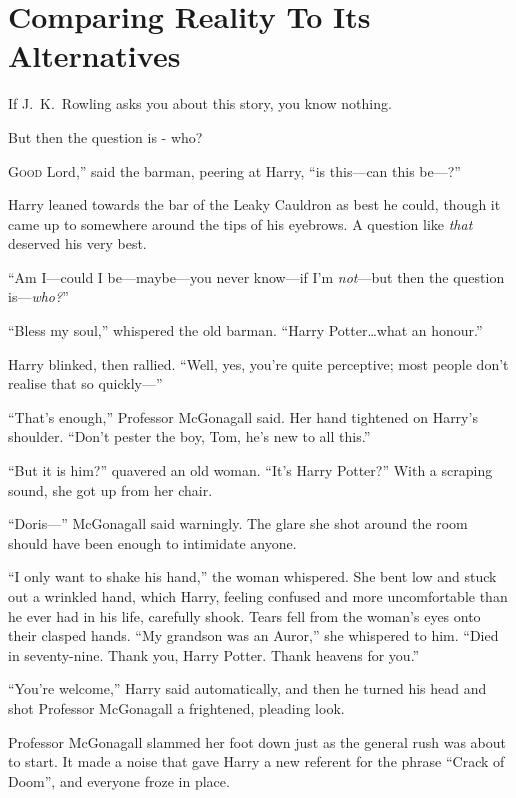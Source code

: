 \chapter{Comparing Reality To Its Alternatives}

\begin{chapterOpeningAuthorNote}
If J.~K.~Rowling asks you about this story, you know nothing.
\end{chapterOpeningAuthorNote}
\begin{chapterOpeningQuote}
But then the question is - who?
\end{chapterOpeningQuote}

\lettrine[ante=“]{G}{ood} Lord,” said the barman, peering at Harry, “is this—can this be—?”

Harry leaned towards the bar of the Leaky Cauldron as best he could, though it came up to somewhere around the tips of his eyebrows. A question like \emph{that} deserved his very best.

“Am I—could I be—maybe—you never know—if I’m \emph{not}—but then the question is—\emph{who?}”

“Bless my soul,” whispered the old barman. “Harry Potter…what an honour.”

Harry blinked, then rallied. “Well, yes, you’re quite perceptive; most people don’t realise that so quickly—”

“That’s enough,” Professor McGonagall said. Her hand tightened on Harry’s shoulder. “Don’t pester the boy, Tom, he’s new to all this.”

“But it is him?” quavered an old woman. “It’s Harry Potter?” With a scraping sound, she got up from her chair.

“Doris—” McGonagall said warningly. The glare she shot around the room should have been enough to intimidate anyone.

“I only want to shake his hand,” the woman whispered. She bent low and stuck out a wrinkled hand, which Harry, feeling confused and more uncomfortable than he ever had in his life, carefully shook. Tears fell from the woman’s eyes onto their clasped hands. “My grandson was an Auror,” she whispered to him. “Died in seventy-nine. Thank you, Harry Potter. Thank heavens for you.”

“You’re welcome,” Harry said automatically, and then he turned his head and shot Professor McGonagall a frightened, pleading look.

Professor McGonagall slammed her foot down just as the general rush was about to start. It made a noise that gave Harry a new referent for the phrase “Crack of Doom”, and everyone froze in place.

